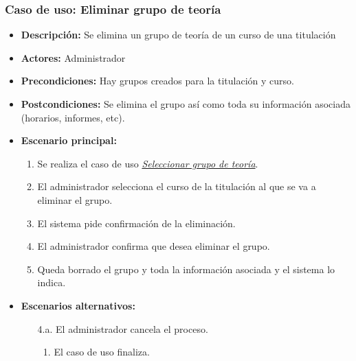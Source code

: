 \documentclass{book}
\begin{document}
\subsubsection*{Caso de uso: Eliminar grupo de teoría}
\begin{itemize}
\item{\bf Descripción:} Se elimina un grupo de teoría de un curso de una titulación
\item{\bf Actores:} Administrador
\item{\bf Precondiciones:} Hay grupos creados para la titulación y curso.
\item{\bf Postcondiciones:} Se elimina el grupo así como toda su información asociada (horarios, informes, etc).
\item{\bf Escenario principal:}
	\begin{enumerate}
	\item Se realiza el caso de uso {\em \hyperref[select_grupo]{Seleccionar grupo de teoría}}.
	\item El administrador selecciona el curso de la titulación al que se va a eliminar el grupo.
	\item El sistema pide confirmación de la eliminación.
	\item El administrador confirma que desea eliminar el grupo.
	\item Queda borrado el grupo y toda la información asociada y el sistema lo indica.
	\end{enumerate}
\item{\bf Escenarios alternativos:}
	\begin{itemize}
		\item[4.a.] El administrador cancela el proceso.
		\begin{enumerate}
			\item El caso de uso finaliza.
		\end{enumerate}
	\end{itemize}
\end{itemize}
\end{document}
